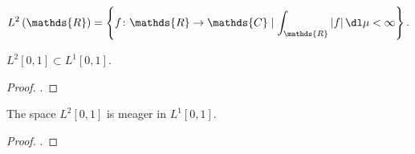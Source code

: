 \begin{frame}
	\begin{equation*}
		L^{2}\left(\mathds{R}\right)=
		\left\{
		f\colon\mathds{R}\to\mathds{C}\mid
		\int_{\mathds{R}}\left|f\right|\dl\mu<\infty
		\right\}.
	\end{equation*}

	\begin{theorem}
		$L^{2}\left[0,1\right]\subset L^{1}\left[0,1\right]$.
	\end{theorem}

	\begin{proof}
		.
	\end{proof}

	\begin{theorem}
		The space $L^{2}\left[0,1\right]$ is meager in $L^{1}\left[0,1\right]$.
	\end{theorem}

	\begin{proof}
		.
	\end{proof}
\end{frame}
